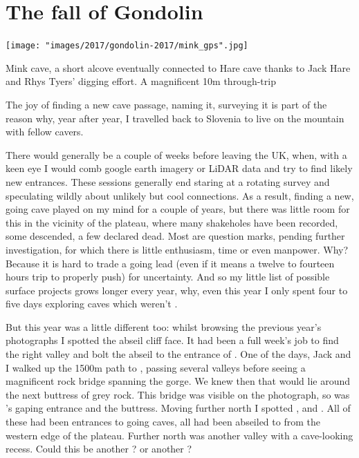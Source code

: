 \section{The fall of Gondolin}

\begin{marginfigure}
\checkoddpage \ifoddpage \forcerectofloat \else \forceversofloat \fi
\centering
 \texttt{[image: "images/2017/gondolin-2017/mink\_gps".jpg]} 
 \caption{Mink cave, a short alcove eventually connected to Hare cave thanks to Jack Hare and Rhys Tyers' digging effort. A magnificent 10m through-trip }
 \label{mink gps}
\end{marginfigure}

The joy of finding a new cave passage, naming it, surveying it is part of the reason why, year after year, I travelled back to Slovenia to live on the mountain with fellow cavers. 

There would generally be a couple of weeks before leaving the UK, when, with a keen eye I would comb google earth imagery or LiDAR data and try to find likely new entrances. These sessions generally end staring at a rotating survey and speculating wildly about unlikely but cool connections. As a result, finding a new, going cave played on my mind for a couple of years, but there was little room for this in the vicinity of the plateau, where many shakeholes have been recorded, some descended, a few declared dead. Most are question marks, pending further investigation, for which there is little enthusiasm, time or even manpower. Why? Because it is hard to trade a going lead (even if it means a twelve to fourteen hours trip to properly push) for uncertainty. And so my little list of possible surface projects grows longer every year, why, even this year I only spent four to five days exploring caves which weren't .

But this year was a little different too: whilst browsing the previous year's photographs I spotted the abseil cliff face. It had been a full week's job to find the right valley and bolt the abseil to the entrance of . One of the days, Jack and I walked up the 1500m path to , passing several valleys before seeing a magnificent rock bridge spanning the gorge. We knew then that  would lie around the next buttress of grey rock. This bridge was visible on the photograph, so was 's gaping entrance and the buttress. Moving further north I spotted ,  and . All of these had been entrances to going caves, all had been abseiled to from the western edge of the plateau. Further north was another valley with a cave-looking recess. Could this be another ? or another ?

